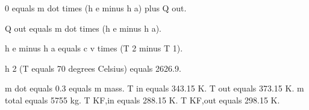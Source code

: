 0 equals m dot times (h e minus h a) plus Q out.  

Q out equals m dot times (h e minus h a).  

h e minus h a equals c v times (T 2 minus T 1).  

h 2 (T equals 70 degrees Celsius) equals 2626.9.  

m dot equals 0.3 equals m mass.  
T in equals 343.15 K.  
T out equals 373.15 K.  
m total equals 5755 kg.  
T KF,in equals 288.15 K.  
T KF,out equals 298.15 K.